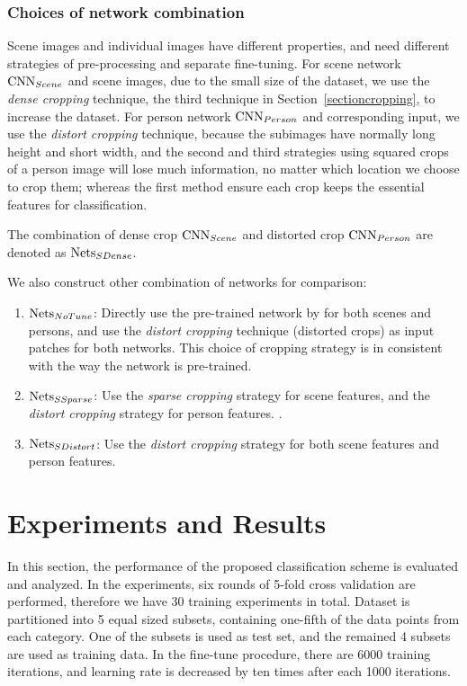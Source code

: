 \documentclass[10pt,twocolumn,letterpaper]{article}
\begin{document}
\subsubsection{Choices of network combination}
\label{sectionmethods}
Scene images and individual images have different properties, and need different strategies of pre-processing and separate fine-tuning. For scene network $\textup{CNN}_{Scene}$ and scene images, due to the small size of the dataset, we use the \emph{dense cropping} technique, the third technique in Section~\ref{sectioncropping}, to increase the dataset. For person network $\textup{CNN}_{Person}$ and corresponding input, we use the \emph{distort cropping} technique, because the subimages have normally long height and short width, and the second and third strategies using squared crops of a person image will lose much information, no matter which location we choose to crop them; whereas the first method ensure each crop keeps the essential features for classification. 

The combination of dense crop $\textup{CNN}_{Scene}$ and distorted crop $\textup{CNN}_{Person}$ are denoted as $\textup{Nets}_{SDense}$.

We also construct other combination of networks for comparison:
\begin{enumerate}
\item $\textup{Nets}_{NoTune}$: Directly use the pre-trained network by \cite{caffe} for both scenes and persons, and use the \emph{distort cropping} technique (distorted crops) as input patches for both networks. This choice of cropping strategy is in consistent with the way the network is pre-trained.
\item $\textup{Nets}_{SSparse}$: Use the \emph{sparse cropping} strategy for scene features, and the \emph{distort cropping} strategy for person features. .
\item $\textup{Nets}_{SDistort}$: Use the \emph{distort cropping} strategy for both scene features and person features.
\end{enumerate}


\section{Experiments and Results}
In this section, the performance of the proposed classification scheme is evaluated and analyzed. In the experiments, six rounds of 5-fold cross validation are performed, therefore we have 30 training experiments in total. Dataset is partitioned into 5 equal sized subsets, containing one-fifth of the data points from each category. One of the subsets is used as test set, and the remained 4 subsets are used as training data. In the fine-tune procedure, there are 6000 training iterations, and learning rate is decreased by ten times after each 1000 iterations.
\end{document}
